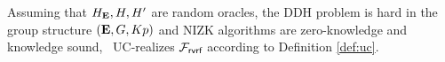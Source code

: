 
\begin{theorem}
	Assuming that $ H_{\mathbf{E}}, H,H' $ are random oracles,  the DDH problem is hard in the group structure $ ({\mathbf{E}}, G,K p) $ and NIZK algorithms are zero-knowledge and knowledge sound, \name \ UC-realizes $\mathcal{F}_{\textsf{rvrf}}$ according to Definition \ref{def:uc}.
\end{theorem}


